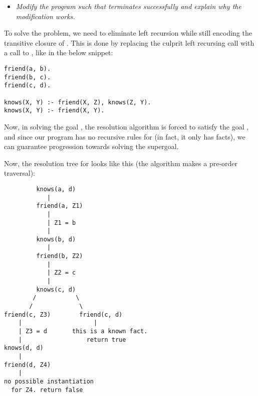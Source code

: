 \newpage
\begin{itemize}
   \item \emph{Modify the program such that  terminates
      successfully and explain why the modification works.}
\end{itemize}

To solve the problem, we need to eliminate left recursion while still encoding
the transitive closure of . This is done by replacing the culprit
left recursing  call with a call to , like in
the below snippet:

\begin{verbatim}
friend(a, b).
friend(b, c).
friend(c, d).

knows(X, Y) :- friend(X, Z), knows(Z, Y).
knows(X, Y) :- friend(X, Y).
\end{verbatim}

Now, in solving the goal , the resolution algorithm is forced to
satisfy the goal , and since our program has no recursive rules
for  (in fact, it only has facts), we can guarantee progression
towards solving the supergoal.

\medskip

Now, the resolution tree for  looks like this (the algorithm
makes a pre-order traversal):

\begin{verbatim}
         knows(a, d)
            |
         friend(a, Z1)
            |
            | Z1 = b
            |
         knows(b, d)
            |
         friend(b, Z2)
            |
            | Z2 = c
            |
         knows(c, d)
        /           \
       /             \
friend(c, Z3)        friend(c, d)
    |                    |
    | Z3 = d       this is a known fact.
    |                  return true
knows(d, d)
    |
friend(d, Z4)
    |
no possible instantiation
  for Z4. return false
\end{verbatim}

\Sectend
